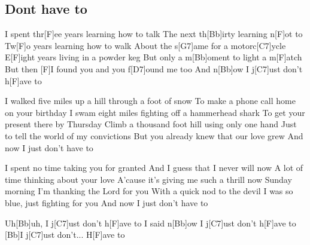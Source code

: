 \subsection*{Dont have to   }
\begin{guitar}
I spent thr[F]ee years learning how to talk
The next th[Bb]irty learning n[F]ot to
Tw[F]o years learning how to walk
About the s[G7]ame for a motorc[C7]ycle
E[F]ight years living in a powder keg
But only a m[Bb]oment to light a m[F]atch
But then [F]I found you and you f[D7]ound me too
And n[Bb]ow I j[C7]ust don't h[F]ave to


I walked five miles up a hill through a foot of snow
To make a phone call home on your birthday
I swam eight miles fighting off a hammerhead shark
To get your present there by Thursday
Climb a thousand foot hill using only one hand
Just to tell the world of my convictions
But you already knew that our love grew
And now I just don't have to



I spent no time taking you for granted
And I guess that I never will now
A lot of time thinking about your love
A'cause it's giving me such a thrill now
Sunday morning I'm thanking the Lord for you
With a quick nod to the devil
I was so blue, just fighting for you
And now I just don't have to



Uh[Bb]uh, I j[C7]ust don't h[F]ave to
I said n[Bb]ow I j[C7]ust don't h[F]ave to
[Bb]I j[C7]ust don't... H[F]ave to
\end{guitar}
